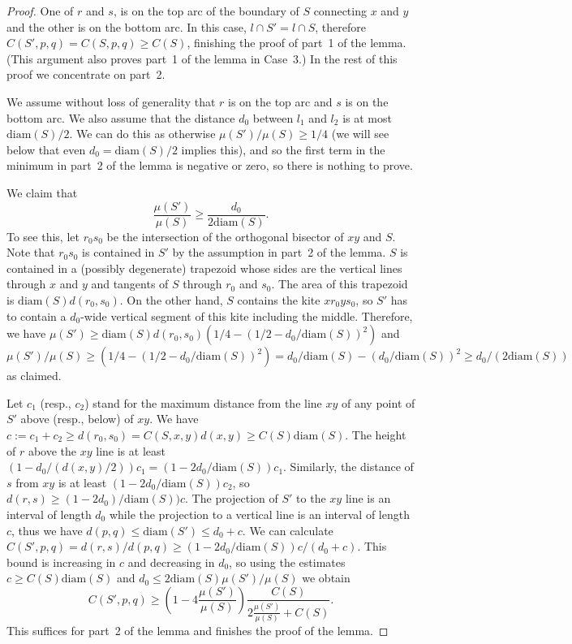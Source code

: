 \documentclass[12pt]{article}
\theoremstyle{plain}
\theoremstyle{definition}
\theoremstyle{remark}
\def\diam{\mathrm{diam}}
\begin{document}
\begin{proof}
 One of $r$ and $s$, is on the top arc of the boundary of $S$ connecting $x$ and $y$ and the other is on the bottom arc. In this case, $l\cap S'=l\cap S$, therefore $C(S',p,q)=C(S,p,q)\ge C(S)$, finishing the proof of part~1 of the lemma. (This argument also proves part~1 of the lemma in Case~3.) In the rest of this proof we concentrate on part~2.

We assume without loss of generality that $r$ is on the top arc and $s$ is on the bottom arc. We also assume that the distance $d_0$ between $l_1$ and $l_2$ is at most $\diam(S)/2$. We can do this as otherwise $\mu(S')/\mu(S)\ge1/4$ (we will see below that even $d_0=\diam(S)/2$ implies this), and so the first term in the minimum in part~2 of the lemma is negative or zero, so there is nothing to prove.

We claim that
$$\frac{\mu(S')}{\mu(S)}\ge\frac{d_0}{2\diam(S)}.$$
To see this, let $r_0s_0$ be the intersection of the orthogonal bisector of $xy$ and $S$. Note that $r_0s_0$ is contained in $S'$ by the assumption in part~2 of the lemma. $S$ is contained in a (possibly degenerate) trapezoid whose sides are the vertical lines through $x$ and $y$ and tangents of $S$ through $r_0$ and $s_0$. The area of this trapezoid is $\diam(S)d(r_0,s_0)$. On the other hand, $S$ contains the kite $xr_0ys_0$, so $S'$ has to contain a $d_0$-wide vertical segment of this kite including the middle. Therefore, we have $\mu(S')\ge\diam(S)d(r_0,s_0)(1/4-(1/2-d_0/\diam(S))^2)$ and $\mu(S')/\mu(S)\ge(1/4-(1/2-d_0/\diam(S))^2)= d_0/\diam(S)-(d_0/\diam(S))^2\ge d_0/(2\diam(S))$ as claimed.

Let $c_1$ (resp., $c_2$) stand for the maximum distance from the line $xy$ of any point of $S'$ above (resp., below) of $xy$. We have $c:=c_1+c_2\ge d(r_0,s_0)=C(S,x,y)d(x,y)\ge C(S)\diam(S)$. The height of $r$ above the $xy$ line is at least $(1-d_0/(d(x,y)/2))c_1=(1-2d_0/\diam(S))c_1$. Similarly, the distance of $s$ from $xy$ is at least $(1-2d_0/\diam(S))c_2$, so $d(r,s)\ge(1-2d_0)/\diam(S))c$. The projection of $S'$ to the $xy$ line is an interval of length $d_0$ while the projection to a vertical line is an interval of length $c$, thus we have $d(p,q)\le\diam(S')\le d_0+c$. We can calculate $C(S',p,q)=d(r,s)/d(p,q)\ge(1-2d_0/\diam(S))c/(d_0+c)$. This bound is increasing in $c$ and decreasing in $d_0$, so using the estimates $c\ge C(S)\diam(S)$ and $d_0\le2\diam(S)\mu(S')/\mu(S)$ we obtain
$$C(S',p,q)\ge\left(1-4\frac{\mu(S')}{\mu(S)}\right)\frac{C(S)}{2\frac{\mu(S')}{\mu(S)}+C(S)}.$$
This suffices for part~2 of the lemma and finishes the proof of the lemma.
\end{proof}
\end{document}
